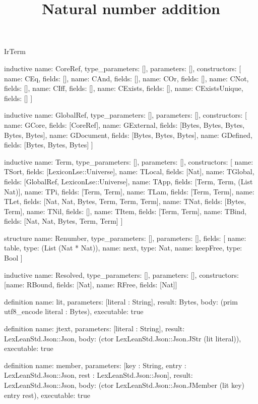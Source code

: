 \begin{lexlean}{IrTerm}
\title{Natural number addition}
\begin{semanticmodule}
inductive{
  name: CoreRef,
  type_parameters: [],
  parameters: [],
  constructors: [
    {name: CEq, fields: []},
    {name: CAnd, fields: []},
    {name: COr, fields: []},
    {name: CNot, fields: []},
    {name: CIff, fields: []},
    {name: CExists, fields: []},
    {name: CExistsUnique, fields: []}
  ]
}

inductive{
  name: GlobalRef,
  type_parameters: [],
  parameters: [],
  constructors: [
    {name: GCore, fields: [CoreRef]},
    {name: GExternal, fields: [Bytes, Bytes, Bytes, Bytes, Bytes]},
    {name: GDocument, fields: [Bytes, Bytes, Bytes]},
    {name: GDefined, fields: [Bytes, Bytes, Bytes]}
  ]
}

inductive{
  name: Term,
  type_parameters: [],
  parameters: [],
  constructors: [
    {name: TSort, fields: [LexiconLse::Universe]},
    {name: TLocal, fields: [Nat]},
    {name: TGlobal, fields: [GlobalRef, LexiconLse::Universe]},
    {name: TApp, fields: [Term, Term, (List Nat)]},
    {name: TPi, fields: [Term, Term]},
    {name: TLam, fields: [Term, Term]},
    {name: TLet, fields: [Nat, Nat, Bytes, Term, Term, Term]},
    {name: TNat, fields: [Bytes, Term]},
    {name: TNil, fields: []},
    {name: TItem, fields: [Term, Term]},
    {name: TBind, fields: [Nat, Nat, Bytes, Term, Term]}
  ]
}

structure{
  name: Renumber,
  type_parameters: [],
  parameters: [],
  fields: [
    {name: table, type: (List (Nat * Nat))},
    {name: next, type: Nat},
    {name: keepFree, type: Bool}
  ]
}

inductive{
  name: Resolved,
  type_parameters: [],
  parameters: [],
  constructors: [{name: RBound, fields: [Nat]}, {name: RFree, fields: [Nat]}]
}

definition{
  name: lit,
  parameters: [literal : String],
  result: Bytes,
  body: (prim utf8_encode literal : Bytes),
  executable: true
}

definition{
  name: jtext,
  parameters: [literal : String],
  result: LexLeanStd.Json::Json,
  body: (ctor LexLeanStd.Json::Json.JStr (lit literal)),
  executable: true
}

definition{
  name: member,
  parameters: [key : String, entry : LexLeanStd.Json::Json, rest : LexLeanStd.Json::Json],
  result: LexLeanStd.Json::Json,
  body: (ctor LexLeanStd.Json::Json.JMember (lit key) entry rest),
  executable: true
}


\end{semanticmodule}
\end{lexlean}
